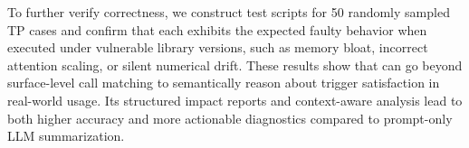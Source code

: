 
To further verify correctness, we construct test scripts for 50 randomly sampled TP cases and confirm that each exhibits the expected faulty behavior when executed under vulnerable library versions, such as memory bloat, incorrect attention scaling, or silent numerical drift.
These results show that \appname can go beyond surface-level call matching to semantically reason about trigger satisfaction in real-world usage. 
Its structured impact reports and context-aware analysis lead to both higher accuracy and more actionable diagnostics compared to prompt-only LLM summarization.


%



